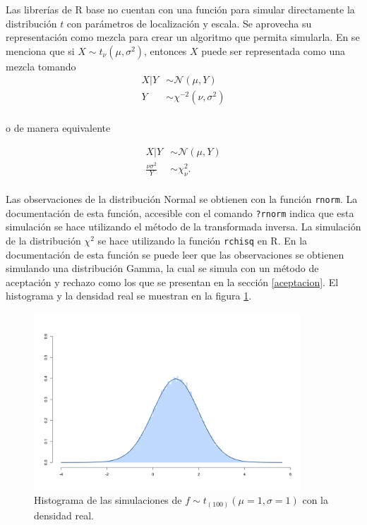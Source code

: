\documentclass[11pt,a4paper]{article}
\begin{document}
Las librerías de R base no cuentan con una función para simular directamente la distribución $t$ con parámetros de localización y escala. Se aprovecha su representación como mezcla para crear un algoritmo que permita simularla. En \citet{gelman} se menciona que si $X\sim t_\nu (\mu, \sigma^2)$, entonces $X$ puede ser representada como una mezcla tomando 
\begin{align*}
X|Y &\sim \mathcal{N}(\mu , Y)\\
Y &\sim \chi ^{-2}(\nu, \sigma ^2)\\
\end{align*}

o de manera equivalente

\begin{align*}
X|Y &\sim \mathcal{N}(\mu , Y)\\
\frac{\nu\sigma ^2}{Y} &\sim \chi ^2_{\nu}.\\
\end{align*}

Las observaciones de la distribución Normal se obtienen con la función \texttt{rnorm}. La documentación de esta función, accesible con el comando \texttt{?rnorm} indica que esta simulación se hace utilizando el método de la transformada inversa. La simulación de la distribución $\chi^2$ se hace utilizando la función \texttt{rchisq} en R. En la documentación de esta función se puede leer que las observaciones se obtienen simulando una distribución Gamma, la cual se simula con un método de aceptación y rechazo como los que se presentan en la sección \ref{aceptacion}. El histograma y la densidad real se muestran en la figura \ref{fig:t}.\\

\begin{figure}[h]
\centering\includegraphics[width=10cm]{sim_mezcla.png}
\caption{Histograma de las simulaciones de $f \sim t_{(100)} (\mu = 1, \sigma = 1)$ con la densidad real.}
\label{fig:t}
\end{figure}
\end{document}
